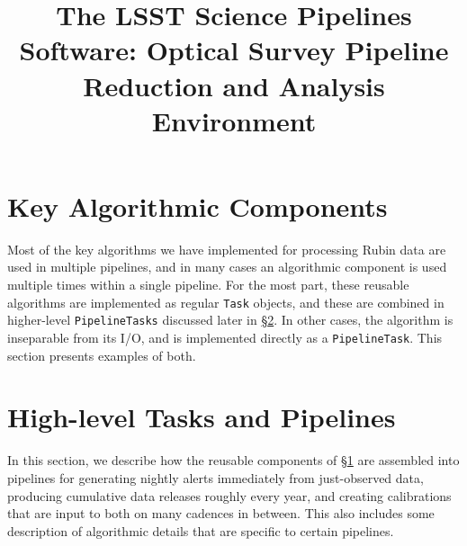 \documentclass[twocolumn]{aastex7}
\providecommand{\secref}[1]{\hyperref[#1]{\S\ref{#1}}}
\begin{document}
\title{The LSST Science Pipelines Software: Optical Survey Pipeline Reduction and Analysis Environment}











\section{Key Algorithmic Components}
\label{sec:components}

Most of the key algorithms we have implemented for processing Rubin data are used in multiple pipelines, and in many cases an algorithmic component is used multiple times within a single pipeline.
For the most part, these reusable algorithms are implemented as regular \texttt{Task} objects, and these are combined in higher-level \texttt{PipelineTasks} discussed later in \secref{sec:tasks-and-pipelines}.
In other cases, the algorithm is inseparable from its I/O, and is implemented directly as a \texttt{PipelineTask}.
This section presents examples of both.










\section{High-level Tasks and Pipelines}
\label{sec:tasks-and-pipelines}

In this section, we describe how the reusable components of \secref{sec:components} are assembled into pipelines for generating nightly alerts immediately from just-observed data, producing cumulative data releases roughly every year, and creating calibrations that are input to both on many cadences in between.
This also includes some description of algorithmic details that are specific to certain pipelines.
\end{document}
